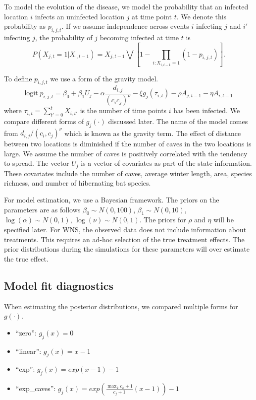 \documentclass[11pt]{article}
\newcommand{\logit}{\text{logit}}
\begin{document}
To model the evolution of the disease, we model the probability that
an infected location $i$ infects an uninfected location $j$ at time
point $t$.  We denote this probability as $p_{i,j,t}$.  If we assume
independence across events $i$ infecting $j$ and $i'$ infecting $j$,
the probability of $j$ becoming infected at time $t$ is
\begin{equation*}
  P(X_{j,t} = 1 | X_{\cdot,t-1}) = X_{j,t-1} \bigvee \left[1 - \prod_{i:
      X_{i,t-1} = 1} ( 1 - p_{i,j,t} ) \right].
\end{equation*}

To define $p_{i,j,t}$ we use a form of the gravity model.
\begin{equation*}
  \logit \; p_{i,j,t} = \beta_0 + \beta_1 U_j 
  - \alpha \frac{d_{i,j}}{(c_ic_j)^\nu} - \xi g_j(\tau_{i,t})
  - \rho A_{j,t-1} - \eta A_{i,t-1}
\end{equation*}
where $\tau_{i,t} = \sum_{t' = 0}^t X_{i,t'}$ is the number of time
points $i$ has been infected.  We compare different forms of
$g_j(\cdot)$ discussed later.  The name of the model comes from
$d_{i,j}/(c_i,c_j)^\nu$ which is known as the gravity term.  The
effect of distance between two locations is diminished if the
number of caves in the two locations is large.  We assume the
number of caves is positively correlated with the tendency to
spread.  The vector $U_j$ is a vector of covariates as part of the
state information.  These covariates include the number of caves,
average winter length, area, species richness, and number of
hibernating bat species.

For model estimation, we use a Bayesian framework.  The priors on the
parameters are as follows $\beta_0 \sim N(0,100)$, $\beta_1 \sim
   N(0,10)$, $\log(\alpha) \sim N(0,1)$, $\log(\nu) \sim N(0,1)$.  The
priors for $\rho$ and $\eta$ will be specified later.  For WNS, the
observed data does not include information about treatments.  This
requires an ad-hoc selection of the true treatment effects.  The prior
distributions during the simulations for these parameters will over
estimate the true effect.

\subsection{Model fit diagnostics}
\label{sec-2-2}

When estimating the posterior distributions, we compared multiple
forms for $g(\cdot)$.
\begin{itemize}
\item ``zero'': $g_j(x) = 0$
\item ``linear'': $g_j(x) = x - 1$
\item ``exp'': $g_j(x) = exp(x - 1) - 1$
\item ``exp\_caves'': $g_j(x) = exp(\frac{\max_k c_k+1}{c_j + 1}(x - 1)) - 1$
\end{itemize}
\end{document}
